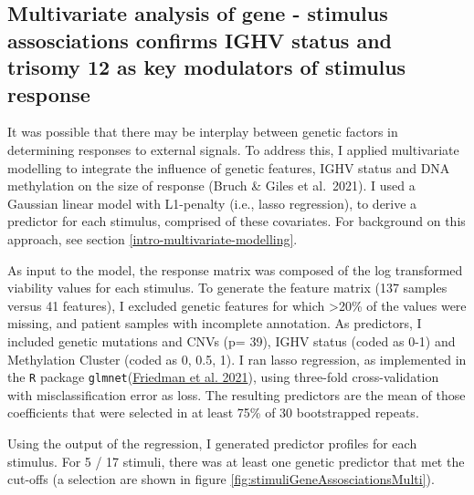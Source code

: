 \documentclass[11pt, a4paper, twosided]{book}
\begin{document}
\hypertarget{multivariate-gene-stimulus-assosciations}{%
\subsection{Multivariate analysis of gene - stimulus assosciations confirms IGHV status and trisomy 12 as key modulators of stimulus response}\label{multivariate-gene-stimulus-assosciations}}

It was possible that there may be interplay between genetic factors in determining responses to external signals. To address this, I applied multivariate modelling to integrate the influence of genetic features, IGHV status and DNA methylation on the size of response (Bruch \& Giles et al.~2021). I used a Gaussian linear model with L1-penalty (i.e., lasso regression), to derive a predictor for each stimulus, comprised of these covariates. For background on this approach, see section \ref{intro-multivariate-modelling}.

As input to the model, the response matrix was composed of the log transformed viability values for each stimulus. To generate the feature matrix (137 samples versus 41 features), I excluded genetic features for which \textgreater20\% of the values were missing, and patient samples with incomplete annotation. As predictors, I included genetic mutations and CNVs (p= 39), IGHV status (coded as 0-1) and Methylation Cluster (coded as 0, 0.5, 1). I ran lasso regression, as implemented in the \texttt{R} package \texttt{glmnet}(\protect\hyperlink{ref-R-glmnet}{Friedman et al. 2021}), using three-fold cross-validation with misclassification error as loss. The resulting predictors are the mean of those coefficients that were selected in at least 75\% of 30 bootstrapped repeats.

Using the output of the regression, I generated predictor profiles for each stimulus. For 5 / 17 stimuli, there was at least one genetic predictor that met the cut-offs (a selection are shown in figure \ref{fig:stimuliGeneAssosciationsMulti}).
\end{document}
